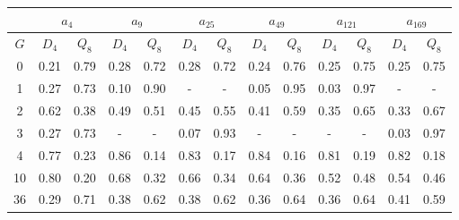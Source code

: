 \begin{table}[h]
   \begin{center}
        \begin{tabular}{c|c|c|c|c|c|c|c|c|c|c|c|c}
            \toprule
            & \multicolumn{2}{c|}{$a_{4}$} & \multicolumn{2}{c|}{$a_{9}$} & \multicolumn{2}{c|}{$a_{25}$} & \multicolumn{2}{c|}{$a_{49}$} & \multicolumn{2}{c|}{$a_{121}$} & \multicolumn{2}{c}{$a_{169}$} \\
            \midrule
            $G$ & $D_{4}$ & $Q_{8}$ & $D_{4}$ & $Q_{8}$ & $D_{4}$ & $Q_{8}$ & $D_{4}$ & $Q_{8}$ & $D_{4}$ & $Q_{8}$ & $D_{4}$ & $Q_{8}$ \\
            \midrule
            0 & 0.21 & 0.79 & 0.28 & 0.72 & 0.28 & 0.72 & 0.24 & 0.76 & 0.25 & 0.75 & 0.25 & 0.75 \\
            1 & 0.27 & 0.73 & 0.10 & 0.90 & - & - & 0.05 & 0.95 & 0.03 & 0.97 & - & - \\
            2 & 0.62 & 0.38 & 0.49 & 0.51 & 0.45 & 0.55 & 0.41 & 0.59 & 0.35 & 0.65 & 0.33 & 0.67 \\
            3 & 0.27 & 0.73 & - & - & 0.07 & 0.93 & - & - & - & - & 0.03 & 0.97 \\
            4 & 0.77 & 0.23 & 0.86 & 0.14 & 0.83 & 0.17 & 0.84 & 0.16 & 0.81 & 0.19 & 0.82 & 0.18 \\
            10 & 0.80 & 0.20 & 0.68 & 0.32 & 0.66 & 0.34 & 0.64 & 0.36 & 0.52 & 0.48 & 0.54 & 0.46 \\
            36 & 0.29 & 0.71 & 0.38 & 0.62 & 0.38 & 0.62 & 0.36 & 0.64 & 0.36 & 0.64 & 0.41 & 0.59 \\
            \bottomrule
        \end{tabular}
   \end{center}
\end{table}
